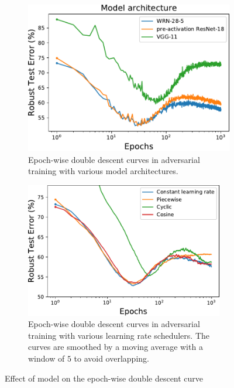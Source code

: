 \begin{figure}[!ht]
\centering
\begin{subfigure}[t]{.48\textwidth}
  \centering
  \includegraphics[width=.95\textwidth]{figures/reconcile-model-architecture.pdf}
  \caption{
  Epoch-wise double descent curves in adversarial training with various model architectures.
  }
  \label{fig:reconcile-model-architecture}
\end{subfigure}\hfill
\begin{subfigure}[t]{.48\textwidth}
  \centering
  \includegraphics[width=0.95\textwidth]{figures/reconcile-lr-scheduler.pdf}
  \caption{
   Epoch-wise double descent curves in adversarial training with various learning rate schedulers.
   The curves are smoothed by a moving average with a window of $5$ to avoid overlapping.
  }
\label{fig:reconcile-lr-scheduler}
\end{subfigure}
  \caption{Effect of model on the epoch-wise double descent curve}
 \label{fig:reconcile-model}
\end{figure}

